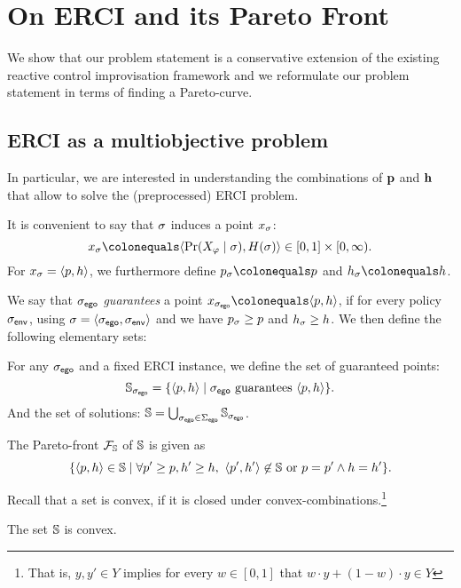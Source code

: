 
\section{On ERCI and its Pareto Front}\label{sec:convex}
We show that our problem statement is a conservative extension of the existing reactive control improvisation framework and we reformulate our problem statement in terms of finding a Pareto-curve.

\subsection{ERCI as a multiobjective problem}

In particular, we are interested in understanding the combinations of $\mathbf{p}$ and $\mathbf{h}$ that allow to solve the (preprocessed) ERCI problem. 

It is convenient to say that $\sigma$ induces a point $x_\sigma$: \[x_\sched \colonequals \langle \Pr(X_\varphi \mid \sched), H(\sched)  \rangle \in [0,1] \times [0,\infty).\] 
For $x_\sigma = \langle p,h \rangle$, we furthermore define $\scp_\sched \colonequals \scp$ and $\rndp_\sched \colonequals \rndp$.

We say that ${\sigma_{\mathsf{ego}}}$ \emph{guarantees} a point $x_\pOneSched \colonequals \langle \scp, \rndp \rangle$, if for every policy ${\sigma_{\mathsf{env}}}$, using $\sigma = \langle {\sigma_{\mathsf{ego}}}, {\sigma_{\mathsf{env}}} \rangle$ and we have $p_\sigma \geq p$ and $h_\sigma \geq h$.
We then define the following elementary sets:
\begin{definition}[Solutions]
For any ${\sigma_{\mathsf{ego}}}$ and a fixed ERCI instance, we define the set of guaranteed points:
  \[ \mathbb{S}_{\sigma_{\mathsf{ego}}} = \{ \langle p, h \rangle \mid  {\sigma_{\mathsf{ego}}} \text{ guarantees } \langle p, h \rangle \}. \]
And the set of solutions:    	
 $ \mathbb{S} = \bigcup_{{\sigma_{\mathsf{ego}}} \in \Sigma_{\mathsf{ego}}} \mathbb{S}_{\sigma_{\mathsf{ego}}}$.
\end{definition}
The Pareto-front $\mathcal{F}_{\mathbb{S}}$ of $\mathbb{S}$ is given as \[ \{ \langle p, h \rangle \in \mathbb{S} \mid \forall p' \geq p, h' \geq h, \ \langle p', h' \rangle \not\in \mathbb{S} \text{ or } p = p' \land  h = h'  \}. \]

\begin{example}
	
\end{example}

Recall that a set is convex, if it is closed under convex-combinations.\footnote{That is, $y, y' \in Y$ implies for every $w \in [0,1]$ that $w \cdot y + (1-w) \cdot y \in Y$}
\begin{proposition}
	The set $\mathbb{S}$ is convex. 
\end{proposition}

